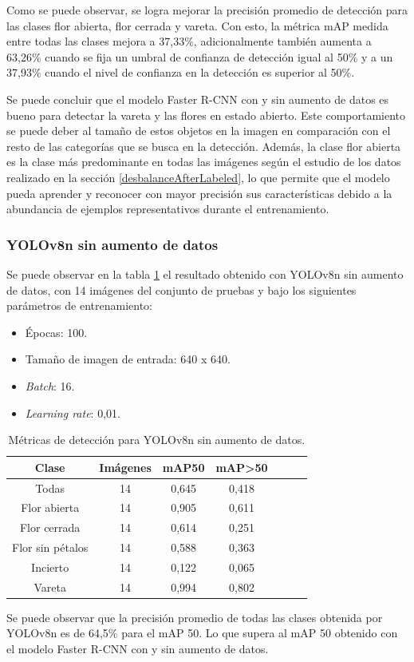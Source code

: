 Como se puede observar, se logra mejorar la precisión promedio de detección para las clases flor abierta, flor cerrada y vareta. Con esto, la métrica mAP medida entre todas las clases mejora a 37,33\%, adicionalmente también aumenta a 63,26\% cuando se fija un umbral de confianza de detección igual al 50\% y a un 37,93\% cuando el nivel de confianza en la detección es superior al 50\%.

Se puede concluir que el modelo Faster R-CNN con y sin aumento de datos es bueno para detectar la vareta y las flores en estado abierto. Este comportamiento se puede deber al tamaño de estos objetos en la imagen en comparación con el resto de las categorías que se busca en la detección. Además, la clase flor abierta es la clase más predominante en todas las imágenes según el estudio de los datos realizado en la sección \ref{desbalanceAfterLabeled}, lo que permite que el modelo pueda aprender y reconocer con mayor precisión sus características debido a la abundancia de ejemplos representativos durante el entrenamiento.

\subsubsection{YOLOv8n sin aumento de datos}

Se puede observar en la tabla \ref{tab:resultadosYoloSinAug} el resultado obtenido con YOLOv8n sin aumento de datos, con 14 imágenes del conjunto de pruebas y bajo los siguientes parámetros de entrenamiento:

\begin{itemize}
	\item Épocas: 100.
    \item Tamaño de imagen de entrada: 640 x 640.
    \item \textit{Batch}: 16.
    \item \textit{Learning rate}: 0,01.
\end{itemize}

\begin{table}[h]
	\centering
	\caption{Métricas de detección para YOLOv8n sin aumento de datos.}
	\begin{tabular}{c c c c c c c}    
		\toprule
		\textbf{Clase}&\textbf{Imágenes}&\textbf{mAP50}&\textbf{mAP>50}\\
		\midrule
		Todas & 14 & 0,645 & 0,418\\
		Flor abierta & 14 & 0,905 & 0,611 \\
		Flor cerrada & 14 & 0,614 & 0,251 \\
		Flor sin pétalos & 14 & 0,588 & 0,363 \\
		Incierto & 14 & 0,122 & 0,065 \\
		Vareta & 14 & 0,994 & 0,802 \\		
		\bottomrule
		\hline
	\end{tabular}
	\label{tab:resultadosYoloSinAug}
\end{table}
\newpage
Se puede observar que la precisión promedio de todas las clases obtenida por YOLOv8n es de 64,5\% para el mAP 50. Lo que supera al mAP 50 obtenido con el modelo Faster R-CNN con y sin aumento de datos.

